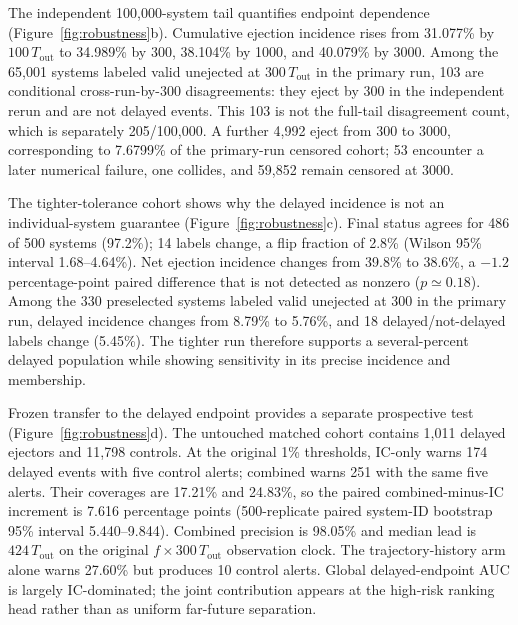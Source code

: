 \documentclass[linenumbers,twocolumn]{aastex702}
\newcommand{\Tout}{T_{\mathrm{out}}}
\begin{document}
The independent 100,000-system tail quantifies endpoint dependence (Figure~\ref{fig:robustness}b). Cumulative ejection incidence rises from 31.077\% by $100\,\Tout$ to 34.989\% by 300, 38.104\% by 1000, and 40.079\% by 3000. Among the 65,001 systems labeled valid unejected at $300\,\Tout$ in the primary run, 103 are conditional cross-run-by-300 disagreements: they eject by 300 in the independent rerun and are not delayed events. This 103 is not the full-tail disagreement count, which is separately 205/100,000. A further 4,992 eject from 300 to 3000, corresponding to 7.6799\% of the primary-run censored cohort; 53 encounter a later numerical failure, one collides, and 59,852 remain censored at 3000.

The tighter-tolerance cohort shows why the delayed incidence is not an individual-system guarantee (Figure~\ref{fig:robustness}c). Final status agrees for 486 of 500 systems (97.2\%); 14 labels change, a flip fraction of 2.8\% (Wilson 95\% interval 1.68--4.64\%). Net ejection incidence changes from 39.8\% to 38.6\%, a $-1.2$ percentage-point paired difference that is not detected as nonzero ($p\simeq0.18$). Among the 330 preselected systems labeled valid unejected at 300 in the primary run, delayed incidence changes from 8.79\% to 5.76\%, and 18 delayed/not-delayed labels change (5.45\%). The tighter run therefore supports a several-percent delayed population while showing sensitivity in its precise incidence and membership.

Frozen transfer to the delayed endpoint provides a separate prospective test (Figure~\ref{fig:robustness}d). The untouched matched cohort contains 1,011 delayed ejectors and 11,798 controls. At the original 1\% thresholds, IC-only warns 174 delayed events with five control alerts; combined warns 251 with the same five alerts. Their coverages are 17.21\% and 24.83\%, so the paired combined-minus-IC increment is 7.616 percentage points (500-replicate paired system-ID bootstrap 95\% interval 5.440--9.844). Combined precision is 98.05\% and median lead is $424\,\Tout$ on the original $f\times300\,\Tout$ observation clock. The trajectory-history arm alone warns 27.60\% but produces 10 control alerts. Global delayed-endpoint AUC is largely IC-dominated; the joint contribution appears at the high-risk ranking head rather than as uniform far-future separation.
\end{document}
